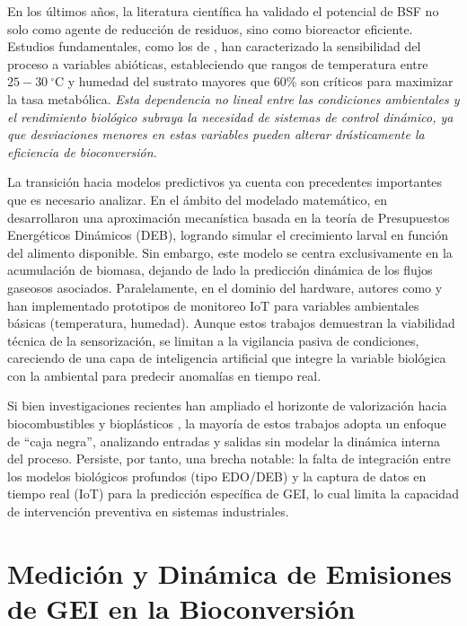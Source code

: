 En los últimos años, la literatura científica ha validado el potencial de BSF no solo como agente de reducción de residuos, sino como bioreactor eficiente. Estudios fundamentales, como los de \textcite{salamEffectDifferentEnvironmental2022}, han caracterizado la sensibilidad del proceso a variables abióticas, estableciendo que rangos de temperatura entre $25-30\ ^{\circ}\mathrm{C}$ y humedad del sustrato mayores que $60\%$ son críticos para maximizar la tasa metabólica. \textit{Esta dependencia no lineal entre las condiciones ambientales y el rendimiento biológico subraya la necesidad de sistemas de control dinámico, ya que desviaciones menores en estas variables pueden alterar drásticamente la eficiencia de bioconversión.}

La transición hacia modelos predictivos ya cuenta con precedentes importantes que es necesario analizar. En el ámbito del modelado matemático, en \parencite{eriksenDynamicModellingFeed2022} desarrollaron una aproximación mecanística basada en la teoría de Presupuestos Energéticos Dinámicos (DEB), logrando simular el crecimiento larval en función del alimento disponible. Sin embargo, este modelo se centra exclusivamente en la acumulación de biomasa, dejando de lado la predicción dinámica de los flujos gaseosos asociados. Paralelamente, en el dominio del hardware, autores como \textcite{rajRealTimeEstimation2023a} y \textcite{duobieneDevelopmentWirelessSensor2022} han implementado prototipos de monitoreo IoT para variables ambientales básicas (temperatura, humedad). Aunque estos trabajos demuestran la viabilidad técnica de la sensorización, se limitan a la vigilancia pasiva de condiciones, careciendo de una capa de inteligencia artificial que integre la variable biológica con la ambiental para predecir anomalías en tiempo real.

Si bien investigaciones recientes han ampliado el horizonte de valorización hacia biocombustibles y bioplásticos \parencite{koyunogluBiofuelProductionUtilizing2024a,suryatiLauricAcidBlack2023}, la mayoría de estos trabajos adopta un enfoque de “caja negra”, analizando entradas y salidas sin modelar la dinámica interna del proceso. Persiste, por tanto, una brecha notable: la falta de integración entre los modelos biológicos profundos (tipo EDO/DEB) y la captura de datos en tiempo real (IoT) para la predicción específica de GEI, lo cual limita la capacidad de intervención preventiva en sistemas industriales.

\section{Medición y Dinámica de Emisiones de GEI en la Bioconversión}


